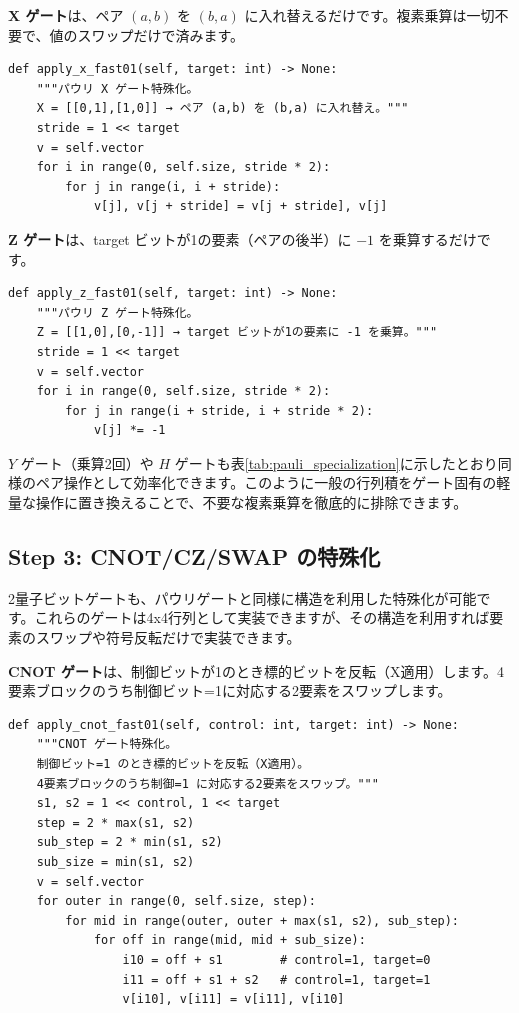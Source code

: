 \textbf{X ゲート}は、ペア $(a, b)$ を $(b, a)$ に入れ替えるだけです。複素乗算は一切不要で、値のスワップだけで済みます。

\begin{lstlisting}[caption=apply\_x：パウリXゲート特殊化（qubit.py）, label=src:apply_x]
def apply_x_fast01(self, target: int) -> None:
    """パウリ X ゲート特殊化。
    X = [[0,1],[1,0]] → ペア (a,b) を (b,a) に入れ替え。"""
    stride = 1 << target
    v = self.vector
    for i in range(0, self.size, stride * 2):
        for j in range(i, i + stride):
            v[j], v[j + stride] = v[j + stride], v[j]
\end{lstlisting}

\textbf{Z ゲート}は、target ビットが1の要素（ペアの後半）に $-1$ を乗算するだけです。

\begin{lstlisting}[caption=apply\_z：パウリZゲート特殊化（qubit.py）, label=src:apply_z]
def apply_z_fast01(self, target: int) -> None:
    """パウリ Z ゲート特殊化。
    Z = [[1,0],[0,-1]] → target ビットが1の要素に -1 を乗算。"""
    stride = 1 << target
    v = self.vector
    for i in range(0, self.size, stride * 2):
        for j in range(i + stride, i + stride * 2):
            v[j] *= -1
\end{lstlisting}

$Y$ ゲート（乗算2回）や $H$ ゲートも表\ref{tab:pauli_specialization}に示したとおり同様のペア操作として効率化できます。このように一般の行列積をゲート固有の軽量な操作に置き換えることで、不要な複素乗算を徹底的に排除できます。

\subsection{Step 3: CNOT/CZ/SWAP の特殊化}

2量子ビットゲートも、パウリゲートと同様に構造を利用した特殊化が可能です。これらのゲートは4x4行列として実装できますが、その構造を利用すれば要素のスワップや符号反転だけで実装できます。

\textbf{CNOT ゲート}は、制御ビットが1のとき標的ビットを反転（X適用）します。4要素ブロックのうち制御ビット=1に対応する2要素をスワップします。

\begin{lstlisting}[caption=apply\_cnot：CNOTゲート特殊化（qubit.py）, label=src:apply_cnot]
def apply_cnot_fast01(self, control: int, target: int) -> None:
    """CNOT ゲート特殊化。
    制御ビット=1 のとき標的ビットを反転（X適用）。
    4要素ブロックのうち制御=1 に対応する2要素をスワップ。"""
    s1, s2 = 1 << control, 1 << target
    step = 2 * max(s1, s2)
    sub_step = 2 * min(s1, s2)
    sub_size = min(s1, s2)
    v = self.vector
    for outer in range(0, self.size, step):
        for mid in range(outer, outer + max(s1, s2), sub_step):
            for off in range(mid, mid + sub_size):
                i10 = off + s1        # control=1, target=0
                i11 = off + s1 + s2   # control=1, target=1
                v[i10], v[i11] = v[i11], v[i10]
\end{lstlisting}

